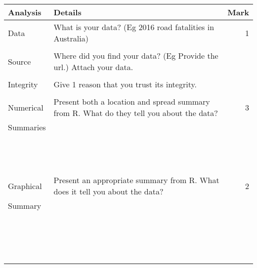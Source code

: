 \documentclass[bigtut]{quiz}\usepackage[]{graphicx}\usepackage[]{color}
\begin{document}
\begin{tutorial}
\begin{tabular}{|l|l|r|} \hline
{\bf Analysis} & {\bf Details} \hspace{11cm} & {\bf Mark} \\ \hline
Data & {\tiny What is your data? (Eg 2016 road fatalities in Australia)} & 1  \\
& & \\ 
Source & {\tiny Where did you find your data? (Eg Provide the url.) Attach your data.} &  \\ 
& & \\ 
Integrity &  {\tiny Give 1 reason that you trust its integrity.} &   \\ 
& & \\ \hline
Numerical  & {\tiny Present both a location and spread summary from R. What do they tell you about the data?}  & 3 \\ 
Summaries & & \\ 
& & \\ 
& & \\ 
& & \\
& & \\ 
& & \\ 
& & \\ 
& & \\ 
& & \\  
& & \\ 
& & \\ 
& & \\ 
& & \\
& & \\ \hline
Graphical & {\tiny Present an appropriate summary from R. What does it tell you about the data?}  & 2 \\ 
Summary & & \\ 
& & \\ 
& & \\ 
& & \\ 
& & \\ 
& & \\
& & \\ 
& & \\ 
& & \\ 
& & \\ 
& & \\ 
& & \\ 
& & \\ 
& & \\ 
& & \\ 
& & \\ 
& & \\ 
& & \\ 

\end{tabular}
\end{tutorial}
\end{document}
